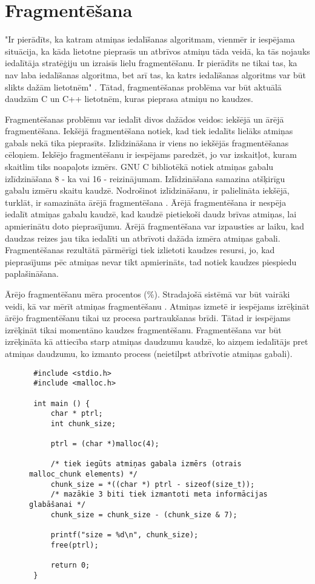 \section{Fragmentēšana}

"Ir pierādīts, ka katram atmiņas iedalīšanas algoritmam, vienmēr ir iespējama situācija, ka kāda lietotne pieprasīs 
un atbrīvos atmiņu tāda veidā, ka tās nojauks iedalītāja stratēģiju un izraisīs lielu fragmentēšanu. 
Ir pierādīts ne tikai tas, ka nav laba iedalīšanas algoritma, bet arī tas, ka katrs iedalīšanas algoritms var būt slikts dažām lietotnēm" \cite{PWMS}.
Tātad, fragmentēšanas problēma var būt aktuālā daudzām C un C++ lietotnēm, kuras pieprasa atmiņu no kaudzes.

Fragmentēšanas problēmu var iedalīt divos dažādos veidos: iekšējā un ārējā fragmentēšana.
Iekšējā fragmentēšana notiek, kad tiek iedalīts lielāks atmiņas gabals nekā tika pieprasīts.
Izlīdzināšana ir viens no iekšējās fragmentēšanas cēloņiem.
Iekšējo fragmentēšanu ir iespējams paredzēt, jo var izskaitļot, kuram skaitlim tiks noapaļots izmērs.
GNU C bibliotēkā notiek atmiņas gabalu izlīdzināšana 8 - ka vai 16 - reizinājumam.
Izlīdzināšana samazina atšķirīgu gabalu izmēru skaitu kaudzē.
Nodrošinot izlīdzināšanu, ir palielināta iekšējā, turklāt, ir samazināta ārējā fragmentēšana \cite{RAN}.
Ārējā fragmentēšana ir nespēja iedalīt atmiņas gabalu kaudzē, kad kaudzē pietiekoši daudz brīvas atmiņas, lai apmierinātu doto pieprasījumu.
Ārējā fragmentēšana var izpausties ar laiku, kad daudzas reizes jau tika iedalīti un atbrīvoti dažāda izmēra atmiņas gabali.
Fragmentēšanas rezultātā pārmērīgi tiek izlietoti kaudzes resursi, jo, kad pieprasījums pēc atmiņas nevar tikt apmierināts, tad notiek kaudzes piespiedu paplašināšana.

Ārējo fragmentēšanu mēra procentos (\%). 
Stradajošā sistēmā var būt vairāki veidi, kā var mērīt atmiņas fragmentēšanu \cite{MSJ}. 
Atmiņas izmetē ir iespējams izrēķināt ārējo fragmentēšanu tikai uz procesa partraukšanas brīdi.
Tātad ir iespējams izrēķināt tikai momentāno kaudzes fragmentēšanu.
Fragmentēšana var būt izrēķināta kā attiecība starp atmiņas daudzumu kaudzē, ko aizņem iedalītājs pret atmiņas daudzumu, ko izmanto process (neietilpst atbrīvotie atmiņas gabali).


\begin{figure}[h]
\begin{lstlisting}
 #include <stdio.h>
 #include <malloc.h>

 int main () {
     char * ptrl;
     int chunk_size;

     ptrl = (char *)malloc(4);
 
     /* tiek iegūts atmiņas gabala izmērs (otrais malloc_chunk elements) */
     chunk_size = *((char *) ptrl - sizeof(size_t));
     /* mazākie 3 biti tiek izmantoti meta informācijas glabāšanai */
     chunk_size = chunk_size - (chunk_size & 7);
 
     printf("size = %d\n", chunk_size);
     free(ptrl);
 
     return 0;
 }
\end{lstlisting}
\caption{\textbf{\fontsize{11}{12}\selectfont {Izmēra noteikšana iedalītam gabalam}}}
\end{figure}


